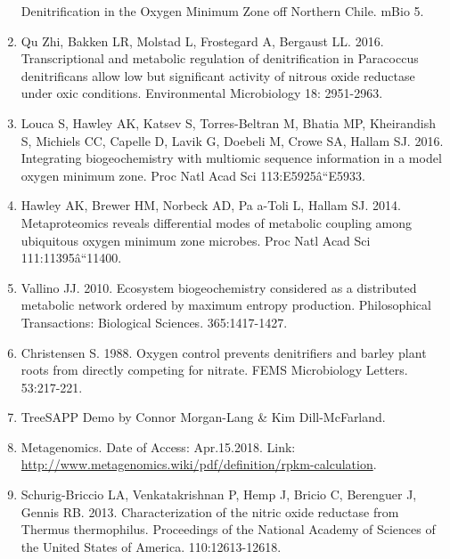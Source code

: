 \documentclass[11 pt,]{article}
\begin{document}
\begin{enumerate}
  Denitrification in the Oxygen Minimum Zone off Northern Chile. mBio 5.
\item
  Qu Zhi, Bakken LR, Molstad L, Frostegard A, Bergaust LL. 2016.
  Transcriptional and metabolic regulation of denitrification in
  Paracoccus denitrificans allow low but significant activity of nitrous
  oxide reductase under oxic conditions. Environmental Microbiology 18:
  2951-2963.
\item
  Louca S, Hawley AK, Katsev S, Torres-Beltran M, Bhatia MP, Kheirandish
  S, Michiels CC, Capelle D, Lavik G, Doebeli M, Crowe SA, Hallam SJ.
  2016. Integrating biogeochemistry with multiomic sequence information
  in a model oxygen minimum zone. Proc Natl Acad Sci 113:E5925â``E5933.
\item
  Hawley AK, Brewer HM, Norbeck AD, Pa a-Toli L, Hallam SJ. 2014.
  Metaproteomics reveals differential modes of metabolic coupling among
  ubiquitous oxygen minimum zone microbes. Proc Natl Acad Sci
  111:11395â``11400.
\item
  Vallino JJ. 2010. Ecosystem biogeochemistry considered as a
  distributed metabolic network ordered by maximum entropy production.
  Philosophical Transactions: Biological Sciences. 365:1417-1427.
\item
  Christensen S. 1988. Oxygen control prevents denitrifiers and barley
  plant roots from directly competing for nitrate. FEMS Microbiology
  Letters. 53:217-221.
\item
  TreeSAPP Demo by Connor Morgan-Lang \& Kim Dill-McFarland.
\item
  Metagenomics. Date of Access: Apr.15.2018. Link:
  \url{http://www.metagenomics.wiki/pdf/definition/rpkm-calculation}.
\item
  Schurig-Briccio LA, Venkatakrishnan P, Hemp J, Bricio C, Berenguer J,
  Gennis RB. 2013. Characterization of the nitric oxide reductase from
  Thermus thermophilus. Proceedings of the National Academy of Sciences
  of the United States of America. 110:12613-12618.
\end{enumerate}
\end{document}
